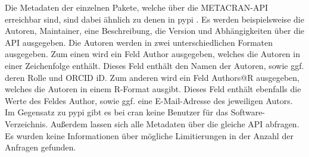Die Metadaten der einzelnen Pakete, welche über die METACRAN-API erreichbar sind, sind dabei ähnlich zu denen in \gls{pypi} \autocite{csardi_pkgsearch_2023}.
Es werden beispielsweise die Autoren, Maintainer, eine Beschreibung, die Version und Abhängigkeiten über die API ausgegeben.
Die Autoren werden in zwei unterschiedlichen Formaten ausgegeben.
Zum einen wird ein Feld \glqq Author\grqq{} ausgegeben, welches die Autoren in einer Zeichenfolge enthält.
Dieses Feld enthält den Namen der Autoren, sowie ggf. deren Rolle und ORCID iD.
Zum anderen wird ein Feld \glqq Authors@R\grqq{} ausgegeben, welches die Autoren in einem R-Format ausgibt.
Dieses Feld enthält ebenfalls die Werte des Feldes \glqq Author\grqq{}, sowie ggf. eine E-Mail-Adresse des jeweiligen Autors. 
Im Gegensatz zu \gls{pypi} gibt es bei \gls{cran} keine Benutzer für das Software-Verzeichnis.
Außerdem lassen sich alle Metadaten über die gleiche API abfragen.
Es wurden keine Informationen über mögliche Limitierungen in der Anzahl der Anfragen gefunden.
